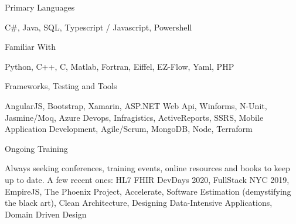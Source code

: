 
\begin{cventries}

  \cventry
    {Primary Languages} %
    {} %
    {} %
    {} %
    {
      \begin{cvitems} %
        \item {C\#, Java, SQL, Typescript / Javascript, Powershell}
      \end{cvitems}
    }
    
     \cventry
    {Familiar With} %
    {} %
    {} %
    {} %
    {
      \begin{cvitems} %
        \item {Python, C++, C, Matlab, Fortran, Eiffel, EZ-Flow, Yaml, PHP}
      \end{cvitems}
    }
    
      \cventry
    {Frameworks, Testing and Tools} %
    {} %
    {} %
    {} %
    {
      \begin{cvitems} %
        \item {AngularJS, Bootstrap, Xamarin, ASP.NET Web Api, Winforms, N-Unit, Jasmine/Moq, Azure Devops, Infragistics, ActiveReports, SSRS, Mobile Application Development, Agile/Scrum, MongoDB, Node, Terraform}
      \end{cvitems}
    }
    \cventry
    {Ongoing Training} %
    {} %
    {} %
    {} %
    {
      \begin{cvitems} %
        \item {Always seeking conferences, training events, online resources and books to keep up to date. A few recent ones: HL7 FHIR DevDays 2020, FullStack NYC 2019, EmpireJS, The Phoenix Project, Accelerate, Software Estimation (demystifying the black art), Clean Architecture, Designing Data-Intensive Applications, Domain Driven Design }
      \end{cvitems}
    }
    
\end{cventries}

